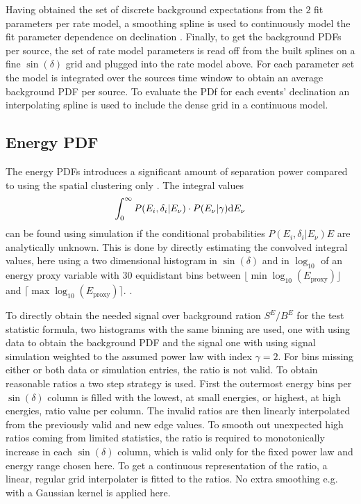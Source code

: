 Having obtained the set of discrete background expectations from the $2$ fit parameters per rate model, a smoothing spline is used to continuously model the fit parameter dependence on declination .
Finally, to get the background PDFs per source, the set of rate model parameters is read off from the built splines on a fine $\sin(\delta)$ grid and plugged into the rate model above.
For each parameter set the model is integrated over the sources time window to obtain an average background PDF per source.
To evaluate the PDf for each events' declination an interpolating spline is used to include the dense grid in a continuous model.

\subsection*{Energy PDF}
The energy PDFs introduces a significant amount of separation power compared to using the spatial clustering only .
The integral values
\begin{equation}
  \int_0^\infty P(E_i,\delta_i|E_\nu)\cdot P(E_\nu|\gamma) \mathrm{d}E_\nu
\end{equation}
can be found using simulation if the conditional probabilities $P(E_i,\delta_i|E_\nu)E$ are analytically unknown.
This is done by directly estimating the convolved integral values, here using a two dimensional histogram in $\sin(\delta)$ and in $\log_{10}$ of an energy proxy variable with $30$ equidistant bins between $\lfloor \min\log_{10}(E_\text{proxy}) \rfloor$ and $\lceil \max\log_{10}(E_\text{proxy}) \rceil$.
.

To directly obtain the needed signal over background ration $S^E / B^E$ for the test statistic formula, two histograms with the same binning are used, one with using data to obtain the background PDF and the signal one with using signal simulation weighted to the assumed power law with index $\gamma = 2$.
For bins missing either or both data or simulation entries, the ratio is not valid.
To obtain reasonable ratios a two step strategy is used.
First the outermost energy bins per $\sin(\delta)$ column is filled with the lowest, at small energies, or highest, at high energies, ratio value per column.
The invalid ratios are then linearly interpolated from the previously valid and new edge values.
To smooth out unexpected high ratios coming from limited statistics, the ratio is required to monotonically increase in each $\sin(\delta)$ column, which is valid only for the fixed power law and energy range chosen here.
To get a continuous representation of the ratio, a linear, regular grid interpolater is fitted to the ratios.
No extra smoothing e.g. with a Gaussian kernel is applied here.

